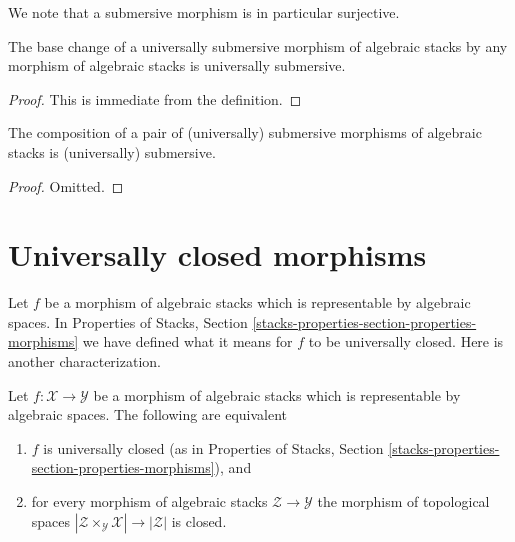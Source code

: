 \noindent
We note that a submersive morphism is in particular surjective.

\begin{lemma}
\label{lemma-base-change-universally-submersive}
The base change of a universally submersive morphism of algebraic stacks
by any morphism of algebraic stacks is universally submersive.
\end{lemma}

\begin{proof}
This is immediate from the definition.
\end{proof}

\begin{lemma}
\label{lemma-composition-universally-submersive}
The composition of a pair of (universally) submersive morphisms of
algebraic stacks is (universally) submersive.
\end{lemma}

\begin{proof}
Omitted.
\end{proof}












\section{Universally closed morphisms}
\label{section-universally-closed}

\noindent
Let $f$ be a morphism of algebraic stacks which is representable by
algebraic spaces. In
Properties of Stacks, Section
\ref{stacks-properties-section-properties-morphisms}
we have defined what it means for $f$ to be universally closed.
Here is another characterization.

\begin{lemma}
\label{lemma-characterize-representable-universally-closed}
Let $f : \mathcal{X} \to \mathcal{Y}$ be a morphism of
algebraic stacks which is representable by algebraic spaces.
The following are equivalent
\begin{enumerate}
\item $f$ is universally closed (as in Properties of Stacks,
Section \ref{stacks-properties-section-properties-morphisms}), and
\item for every morphism of algebraic stacks $\mathcal{Z} \to \mathcal{Y}$
the morphism of topological spaces
$|\mathcal{Z} \times_\mathcal{Y} \mathcal{X}| \to |\mathcal{Z}|$ is closed.
\end{enumerate}
\end{lemma}

